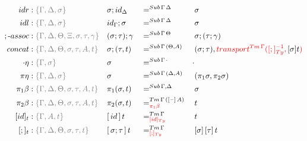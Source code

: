 \documentclass[a4paper,UKenglish,numberwithinsect,cleveref,thm-restate]{lipics-v2021}
\begin{document}
\begin{alignat*}{5}
  \mathsf{idr}    & : \implicit{\Gamma, \Delta, \sigma} && {\sigma ; \idS_{\Delta}} && =^{\Sub\,\Gamma\,\Delta} && {\sigma} \\
  \mathsf{idl}    & : \implicit{\Gamma, \Delta, \sigma} && {\idS_{\Gamma} ; \sigma} && =^{\Sub\,\Gamma\,\Delta} && {\sigma} \\
  ;\text{-}\mathsf{assoc} & : \implicit{\Gamma, \Delta, \Theta, \Xi, \sigma, \tau, \gamma} && (\sigma ; \tau) ; \gamma && =^{\Sub\,\Gamma\,\Theta} &&  \sigma ; (\tau ; \gamma) \\
  \mathsf{concat} & : \implicit{\Gamma, \Delta, \Theta, \sigma, \tau, A, t} && \sigma ; (\tau , t)      && =^{\Sub\,\Gamma\,(\Theta, A)} &&  (\sigma ; \tau) , \alert{\transfib{\Tm\,\Gamma}{[;]_{\Ty}^{-1}}{\color{black}[ \sigma ] t}} \\
  \emptyctx\eta   & : \implicit{\Gamma, \sigma} && \sigma                   && =^{\Sub\,\Gamma\,\emptyctx} & \emptysub \\
  \pi\eta         & : \implicit{\Gamma, \Delta, \sigma} && \sigma                   && =^{\Sub\,\Gamma\,(\Delta, A)} &&  (\pi_1 \sigma, \pi_2 \sigma) \\
  \pi_1\beta      & : \implicit{\Gamma, \Delta, \Theta, \sigma, \tau, A, t} && \pi_1(\sigma , t)        && =^{\Sub\,\Gamma,\Delta} &&  \sigma \\
  \pi_2\beta      & : \implicit{\Gamma, \Delta, \Theta, \sigma, \tau, A, t} && \pi_2(\sigma , t)        && =^{\Tm\,\Gamma\,([\blank]\,A)}_{\alert{\pi_1\beta}} &&  t \\
  [\idS]_t         & : \implicit{\Gamma, A, t} && {[\,\idS\,]\,t}          && =^{\Tm\,\Gamma}_{\alert{[\idS]_\Ty}}  && t \\
  [;]_t            & : \implicit{\Gamma, \Delta, \Theta, \sigma, \tau, t} && {[\,\sigma ; \tau\,]\,t} && =^{\Tm\,\Gamma}_{\alert{[;]_{\Ty}}}   && {[ \sigma ]\,[ \tau ]\,t} \\
\end{alignat*}
\end{document}
